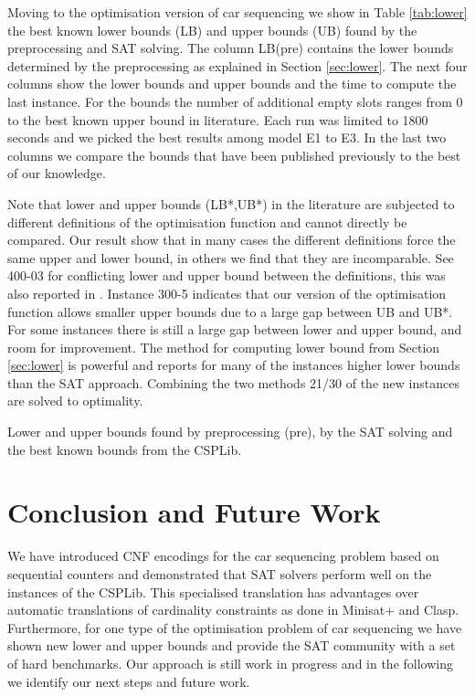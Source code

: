 \documentclass[]{easychair}
\begin{document}
Moving to the optimisation version of car sequencing we show in Table \ref{tab:lower} the best known lower bounds (LB)
and upper bounds (UB) found by the preprocessing and SAT solving. The column LB(pre) contains the lower bounds
determined by the preprocessing as explained in Section \ref{sec:lower}. The next four columns show the lower bounds and upper
bounds and the time to compute the last instance. For the bounds the number of additional empty slots ranges from 0 to
the best known upper bound in literature. Each run was limited to 1800 seconds and we picked the best results among
model E1 to E3. In the last two columns we compare the bounds that have been published previously to the best of our
knowledge.

Note that lower and upper bounds (LB*,UB*) in the literature are subjected to different definitions of the optimisation
function and cannot directly be compared. Our result show that in many cases the different definitions force the same
upper and lower bound, in others we find that they are incomparable. See 400-03 for conflicting lower and upper bound
between the definitions, this was also reported in \cite{Estellon06}. Instance 300-5 indicates that our version of the
optimisation function allows smaller upper bounds due to a large gap between UB and UB*. For some instances there is
still a large gap between lower and upper bound, and room for improvement.  The method for computing lower bound from
Section \ref{sec:lower} is powerful and reports for many of the instances higher lower bounds than the SAT approach.
Combining the two methods 21/30 of the new instances are solved to
optimality.

\begin{table}[htbp]
    \caption{Lower and upper bounds found by preprocessing (pre), by the SAT solving and the best known bounds from the
    CSPLib.}
    \centering
    
    \label{tab:lower}
\end{table}

\section{Conclusion and Future Work}

We have introduced CNF encodings for the car sequencing problem based on sequential counters and demonstrated that SAT
solvers perform well on the instances of the CSPLib. This specialised translation has advantages over automatic translations
of cardinality constraints as done in Minisat+ and Clasp. Furthermore, for one type of the optimisation problem of car
sequencing we have shown new lower and upper bounds and provide the SAT community with a set of hard benchmarks. Our
approach is still work in progress and in the following we identify our next steps and future work. 
\end{document}
